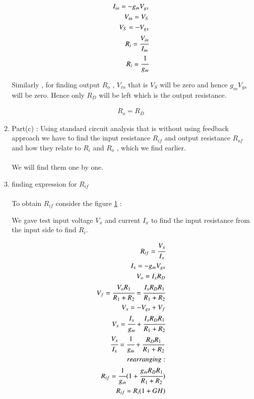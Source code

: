 \begin{enumerate}[label=\arabic*.,ref=\theenumi]
\begin{align}
I_{in} = -g_{m}V_{gs}\\
V_{in} = V_{S}\\
V_{S} = -V_{gs}\\
R_{i} = \cfrac{V_{in}}{I_{in}}\\
R_{i} = \cfrac{1}{g_{m}}
\end{align}

Similarly , for finding output $R_{o}$ , $V_{in}$ that is $V_{S}$ will be zero and hence $g_{m}V_{gs}$ will be zero. Hence only $R_{D}$ will 
be left which is the output resistance.

\begin{align}
R_{o}=R_{D}
\end{align}
\item Part(c) : Using standard circuit analysis that is without using feedback approach we have to find the input resistance $R_{if}$ and output resistance $R_{of}$ and how they relate to $R_{i}$ and $R_{o}$ , which we find earlier.\\
\solution \\
We will find them one by one.

\begin{figure}[ht!]
	\begin{center}
		\resizebox{\columnwidth}{!}{}
	\end{center}
	\caption{}
	\label{fig:Small signal for finding input resistance}
\end{figure}

\item finding expression for $R_{if}$\\
\solution\\

To obtain $R_{if}$ consider the figure \ref{fig:Small signal for finding input resistance} :



We gave test input voltage $V_{x}$ and current $I_{x}$ to find the input resistance from the input side to find $R_{i}$.

\begin{align}
R_{if} = \cfrac{V_{x}}{I_{x}}\\
I_{x} = -g_{m}V_{gs} \\
V_{o} = I_{x}R_{D}\\
V_{f} = \cfrac{V_{o}R_{1}}{R_{1}+R_{2}} = \cfrac{I_{x}R_{D}R_{1}}{R_{1}+R_{2}} \\
V_{x} = -V_{gs} + V_{f} \\
V_{x} = \cfrac{I_{x}}{g_{m}} + \cfrac{I_{x}R_{D}R_{1}}{R_{1}+R_{2}}\\
\cfrac{V_{x}}{I_{x}} =  \cfrac{1}{g_{m}} + \frac{R_{D}R_{1}}{R_{1}+R_{2}}\\
rearranging :\\
R_{if} =  \cfrac{1}{g_{m}}(1+\cfrac{g_{m}R_{D}R_{1}}{R_{1}+R_{2}})\\
R_{if} = R_{i}(1+GH)
\end{align}


\end{enumerate}
